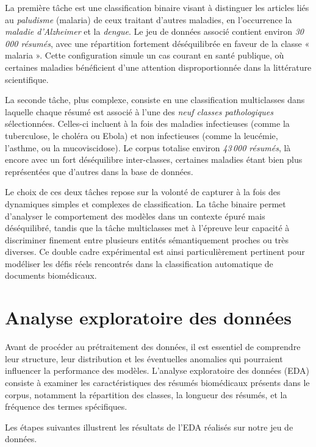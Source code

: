 \documentclass[12pt]{report}
\begin{document}
La première tâche est une classification binaire visant à distinguer les articles liés au \textit{paludisme} (malaria) de ceux traitant d'autres maladies, en l’occurrence la \textit{maladie d’Alzheimer} et la \textit{dengue}. Le jeu de données associé contient environ \textit{30\,000 résumés}, avec une répartition fortement déséquilibrée en faveur de la classe « malaria ». Cette configuration simule un cas courant en santé publique, où certaines maladies bénéficient d’une attention disproportionnée dans la littérature scientifique.

La seconde tâche, plus complexe, consiste en une classification multiclasses dans laquelle chaque résumé est associé à l’une des \textit{neuf classes pathologiques} sélectionnées. Celles-ci incluent à la fois des maladies infectieuses (comme la tuberculose, le choléra ou Ebola) et non infectieuses (comme la leucémie, l’asthme, ou la mucoviscidose). Le corpus totalise environ \textit{43\,000 résumés}, là encore avec un fort déséquilibre inter-classes, certaines maladies étant bien plus représentées que d'autres dans la base de données.

Le choix de ces deux tâches repose sur la volonté de capturer à la fois des dynamiques simples et complexes de classification. La tâche binaire permet d’analyser le comportement des modèles dans un contexte épuré mais déséquilibré, tandis que la tâche multiclasses met à l’épreuve leur capacité à discriminer finement entre plusieurs entités sémantiquement proches ou très diverses. Ce double cadre expérimental est ainsi particulièrement pertinent pour modéliser les défis réels rencontrés dans la classification automatique de documents biomédicaux.

\section{Analyse exploratoire des données}

Avant de procéder au prétraitement des données, il est essentiel de comprendre leur structure, leur distribution et les éventuelles anomalies qui pourraient influencer la performance des modèles. L'analyse exploratoire des données (EDA) consiste à examiner les caractéristiques des résumés biomédicaux présents dans le corpus, notamment la répartition des classes, la longueur des résumés, et la fréquence des termes spécifiques.

Les étapes suivantes illustrent les résultats de l'EDA réalisés sur notre jeu de données.
\end{document}
